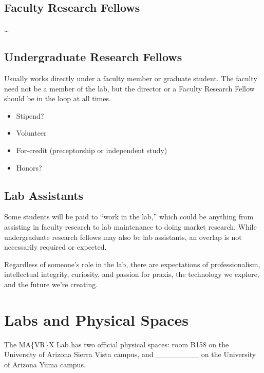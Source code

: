 \documentclass[]{tufte-book}
\providecommand{\tightlist}{%
  \setlength{\itemsep}{0pt}\setlength{\parskip}{0pt}}
\begin{document}
\hypertarget{faculty-research-fellows}{%
\section{Faculty Research Fellows}\label{faculty-research-fellows}}

\ldots{}

\hypertarget{undergraduate-research-fellows}{%
\section{Undergraduate Research Fellows}\label{undergraduate-research-fellows}}

Usually works directly under a faculty member or graduate student. The faculty need not be a member of the lab, but the director or a Faculty Research Fellow should be in the loop at all times.

\begin{itemize}
\tightlist
\item
  Stipend?
\item
  Volunteer
\item
  For-credit (preceptorship or independent study)
\item
  Honors?
\end{itemize}

\hypertarget{lab-assistants}{%
\section{Lab Assistants}\label{lab-assistants}}

Some students will be paid to ``work in the lab,'' which could be anything from assisting in faculty research to lab maintenance to doing market research. While undergraduate research fellows may also be lab assistants, an overlap is not necessarily required or expected.

Regardless of someone's role in the lab, there are expectations of professionalism, intellectual integrity, curiosity, and passion for praxis, the technology we explore, and the future we're creating.

\hypertarget{spaces}{%
\chapter{Labs and Physical Spaces}\label{spaces}}

The MA\{VR\}X Lab has two official physical spaces: room B158 on the University of Arizona Sierra Vista campus, and \_\_\_\_\_\_\_\_ on the University of Arizona Yuma campus.
\end{document}

